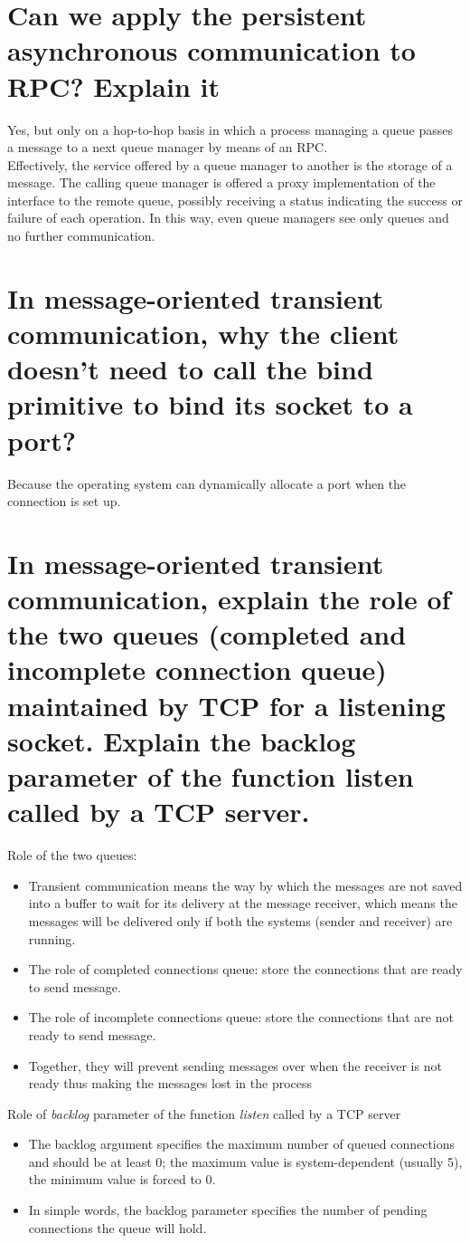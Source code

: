 \documentclass[11pt,a4paper]{report}
\begin{document}
	\section{Can we apply the persistent asynchronous communication to RPC? Explain it}
	Yes, but only on a hop-to-hop basis in which a process managing a queue
passes a message to a next queue manager by means of an RPC.\\
	Effectively, the service offered by a queue manager to another is the storage of a message. The calling queue manager is offered a proxy implementation of the interface to the remote queue, possibly receiving a status indicating the success or failure of each operation. In this way, even queue managers see only queues and no further communication.
	
	\section{In message-oriented transient communication, why the client doesn’t need to call the bind primitive to bind its socket to a port?}
	Because the operating system can dynamically allocate a port when the connection is set up.
	
	\section{In message-oriented transient communication, explain the role of the two queues (completed and incomplete connection queue) maintained by TCP for a listening socket. Explain the backlog parameter of the function listen called by a TCP server.}
	Role of the two queues:
	\begin{itemize}
		\item  Transient communication means the way by which the messages are not saved into a buffer to wait for its delivery at the message receiver, which means the messages will be delivered only if both the systems (sender and receiver) are running.
		\item The role of completed connections queue: store the connections that are ready to send message.
		\item  The role of incomplete connections queue: store the connections that are not ready to send message.
		\item Together, they will prevent sending messages over when the receiver is not ready thus making the messages lost in the process 
	\end{itemize}
	Role of \emph{backlog} parameter of the function \emph{listen} called by a TCP server
	\begin{itemize}
		\item The backlog argument specifies the maximum number of queued connections and should be at least 0; the maximum value is system-dependent (usually 5), the minimum value is forced to 0.
		\item In simple words, the backlog parameter specifies the number of pending connections the queue will hold.
	\end{itemize}
	
\end{document}
